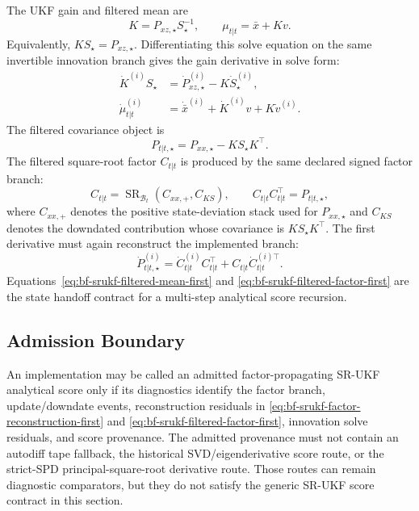 The UKF gain and filtered mean are
\[
  K=P_{xz,\star}S_\star^{-1},\qquad
  \mu_{t|t}=\bar x+Kv .
\]
Equivalently, \(KS_\star=P_{xz,\star}\).  Differentiating this solve equation
on the same invertible innovation branch gives the gain derivative in solve
form:
\begin{align}
\label{eq:bf-srukf-gain-first}
  \dot K^{(i)}S_\star
  &=
  \dot P_{xz,\star}^{(i)}-K\dot S_\star^{(i)},\\
\label{eq:bf-srukf-filtered-mean-first}
  \dot\mu_{t|t}^{(i)}
  &=
  \dot{\bar x}^{(i)}+\dot K^{(i)}v+K\dot v^{(i)} .
\end{align}
The filtered covariance object is
\[
  P_{t|t,\star}
  =
  P_{xx,\star}-K S_\star K^\top .
\]
The filtered square-root factor \(C_{t|t}\) is produced by the same declared
signed factor branch:
\begin{equation}
\label{eq:bf-srukf-filtered-factor}
  C_{t|t}
  =
  \operatorname{SR}_{\mathcal B_t}
  \left(C_{xx,+},C_{KS}\right),
  \qquad
  C_{t|t}C_{t|t}^\top=P_{t|t,\star},
\end{equation}
where \(C_{xx,+}\) denotes the positive state-deviation stack used for
\(P_{xx,\star}\) and \(C_{KS}\) denotes the downdated contribution whose
covariance is \(K S_\star K^\top\).  The first derivative must again reconstruct
the implemented branch:
\begin{equation}
\label{eq:bf-srukf-filtered-factor-first}
  \dot P_{t|t,\star}^{(i)}
  =
  \dot C_{t|t}^{(i)}C_{t|t}^\top
  +C_{t|t}\dot C_{t|t}^{(i)\top}.
\end{equation}
Equations~\eqref{eq:bf-srukf-filtered-mean-first} and
\eqref{eq:bf-srukf-filtered-factor-first} are the state handoff contract for a
multi-step analytical score recursion.

\subsection{Admission Boundary}
\label{sec:bf-srukf-admission-boundary}

An implementation may be called an admitted factor-propagating SR-UKF analytical
score only if its diagnostics identify the factor branch, update/downdate
events, reconstruction residuals in
\eqref{eq:bf-srukf-factor-reconstruction-first} and
\eqref{eq:bf-srukf-filtered-factor-first}, innovation solve residuals, and
score provenance.  The admitted provenance must not contain an autodiff tape
fallback, the historical SVD/eigenderivative score route, or the strict-SPD
principal-square-root derivative route.  Those routes can remain diagnostic
comparators, but they do not satisfy the generic SR-UKF score contract in this
section.

